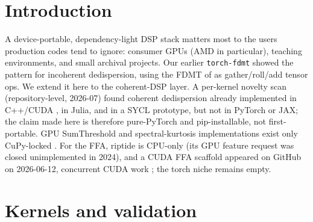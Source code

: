 \documentclass[twocolumn]{aastex631}
\newcommand{\code}[1]{\texttt{#1}}
\begin{document}

\section{Introduction}
A device-portable, dependency-light DSP stack matters most to the users production codes
tend to ignore: consumer GPUs (AMD in particular), teaching environments, and small archival
projects. Our earlier \code{torch-fdmt} showed the pattern for incoherent dedispersion,
using the FDMT of \citealt{zackay2017} as gather/roll/add tensor ops. We extend it here to
the coherent-DSP layer. A per-kernel novelty scan (repository-level, 2026-07) found coherent
dedispersion already implemented in C++/CUDA \citep[dspsr, CDMT;][]{vanstraten2011,bassa2017},
in Julia, and in a SYCL prototype, but not in PyTorch or JAX; the claim made here is
therefore pure-PyTorch and pip-installable, not first-portable. GPU SumThreshold and
spectral-kurtosis implementations exist only CuPy-locked \citep{kania2026}. For the FFA,
riptide \citep{morello2020} is CPU-only (its GPU feature request was closed unimplemented in
2024), and a CUDA FFA scaffold appeared on GitHub on 2026-06-12, concurrent CUDA work
\citep{gaffa}; the torch niche remains empty.

\section{Kernels and validation}
\label{sec:kernels}
\end{document}
